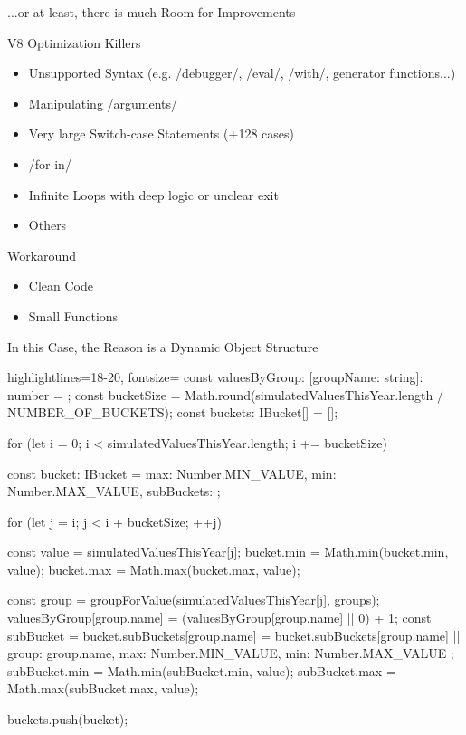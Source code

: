 \begin{frame}{...or at least, there is much Room for Improvements}
	\begin{block}{V8 Optimization Killers~\cite{bluebird2017}}
		\begin{itemize}
			\item Unsupported Syntax (e.g. \javascriptinline/debugger/, \javascriptinline/eval/, \javascriptinline/with/, generator functions...) 
			\item Manipulating \javascriptinline/arguments/
			\item Very large Switch-case Statements (+128 cases)
			\item \javascriptinline/for in/
			\item Infinite Loops with deep logic or unclear exit
			\item Others
		\end{itemize}
	\end{block}
	
	\pause
	\begin{block}{Workaround}
		\begin{itemize}
			\item Clean Code
			\item Small Functions
		\end{itemize}	
	\end{block}
\end{frame}

\begin{frame}{In this Case, the Reason is a Dynamic Object Structure}
	\begin{javascriptcode*}{highlightlines={18-20}, fontsize=\tiny}
const valuesByGroup: { [groupName: string]: number } = {};
const bucketSize = Math.round(simulatedValuesThisYear.length / NUMBER_OF_BUCKETS);
const buckets: IBucket[] = [];

for (let i = 0; i < simulatedValuesThisYear.length; i += bucketSize) {
	const bucket: IBucket = {
		max: Number.MIN_VALUE,
		min: Number.MAX_VALUE,
		subBuckets: {}
	};

	for (let j = i; j < i + bucketSize; ++j) {
		const value = simulatedValuesThisYear[j];
		bucket.min = Math.min(bucket.min, value);
		bucket.max = Math.max(bucket.max, value);

		const group = groupForValue(simulatedValuesThisYear[j], groups);
		valuesByGroup[group.name] = (valuesByGroup[group.name] || 0) + 1;
		const subBucket = bucket.subBuckets[group.name] = bucket.subBuckets[group.name] || 
						{ group: group.name, max: Number.MIN_VALUE, min: Number.MAX_VALUE };
		subBucket.min = Math.min(subBucket.min, value);
		subBucket.max = Math.max(subBucket.max, value);
	}

	buckets.push(bucket);
}
	\end{javascriptcode*}

\end{frame}

